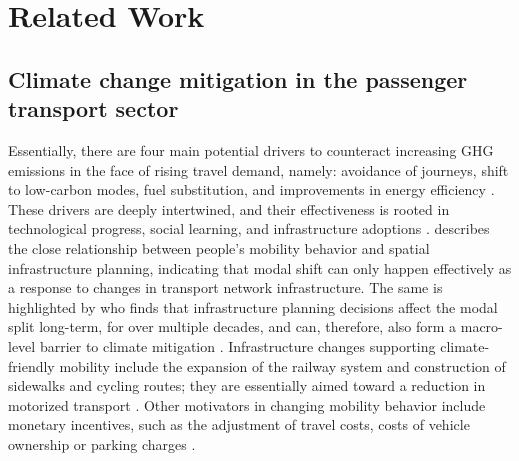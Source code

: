 \documentclass[journal,article,submit,pdftex,moreauthors]{Definitions/mdpi}
\begin{document}
\section{Related Work}

    
    
    

    \subsection{Climate change mitigation in the passenger transport sector}
Essentially, there are four main potential drivers to counteract increasing GHG emissions in the face of rising travel demand, namely: avoidance of journeys, shift to low-carbon modes, fuel substitution, and improvements in energy efficiency \citep{Josefina, Edelenbosch2017, Milovanoff2021}. These drivers are deeply intertwined, and their effectiveness is rooted in technological progress, social learning, and infrastructure adoptions \citep{Edelenbosch2017, Muller2021}. \citet{PRIEMUS2001167} describes the close relationship between people's mobility behavior and spatial infrastructure planning, indicating that modal shift can only happen effectively as a response to changes in transport network infrastructure. The same is highlighted by \citet{briggs2015automotive} who finds that infrastructure planning decisions affect the modal split long-term, for over multiple decades, and can, therefore, also form a macro-level barrier to climate mitigation \citep{UNRUH2000817}. Infrastructure changes supporting climate-friendly mobility include the expansion of the railway system and construction of sidewalks and cycling routes; they are essentially aimed toward a reduction in motorized transport \citep{SONG2017320, Muller2021}. Other motivators in changing mobility behavior include monetary incentives, such as the adjustment of travel costs, costs of vehicle ownership or parking charges \citep{Hammadou2015, Silva2022}. 
    
\end{document}
